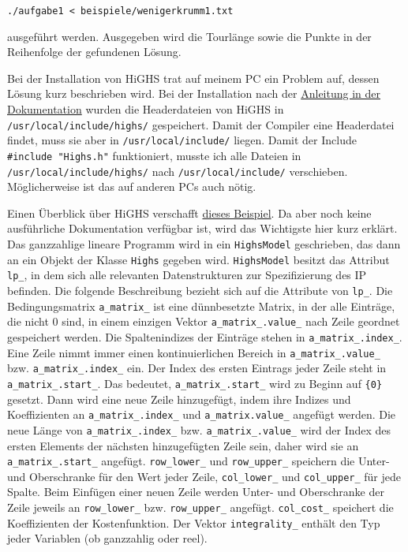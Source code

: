 \documentclass[a4paper, 10pt, ngerman]{article}
\begin{document}
\medskip
\verb|./aufgabe1 < beispiele/wenigerkrumm1.txt|
\medskip

\noindent ausgeführt werden. Ausgegeben wird die Tourlänge sowie die Punkte in der Reihenfolge der gefundenen Lösung.

Bei der Installation von HiGHS trat auf meinem PC ein Problem auf, dessen Lösung kurz beschrieben wird. Bei der Installation nach der \href{https://ergo-code.github.io/HiGHS/dev/cpp/get-started/}{Anleitung in der Dokumentation} wurden die Headerdateien von HiGHS in \verb|/usr/local/include/highs/| gespeichert. Damit der Compiler eine Headerdatei findet, muss sie aber in \verb|/usr/local/include/| liegen. Damit der Include \verb|#include "Highs.h"| funktioniert, musste ich alle Dateien in \verb|/usr/local/include/highs/| nach \verb|/usr/local/include/| verschieben. Möglicherweise ist das auf anderen PCs auch nötig.

Einen Überblick über HiGHS verschafft \href{https://ergo-code.github.io/HiGHS/dev/cpp/library/}{dieses Beispiel}. Da aber noch keine ausführliche Dokumentation verfügbar ist, wird das Wichtigste hier kurz erklärt. Das ganzzahlige lineare Programm wird in ein \verb|HighsModel| geschrieben, das dann an ein Objekt der Klasse \verb|Highs| gegeben wird. \verb|HighsModel| besitzt das Attribut \verb|lp_|, in dem sich alle relevanten Datenstrukturen zur Spezifizierung des IP befinden. Die folgende Beschreibung bezieht sich auf die Attribute von \verb|lp_|. Die Bedingungsmatrix \verb|a_matrix_| ist eine dünnbesetzte Matrix, in der alle Einträge, die nicht 0 sind, in einem einzigen Vektor \verb|a_matrix_.value_| nach Zeile geordnet gespeichert werden. Die Spaltenindizes der Einträge stehen in \verb|a_matrix_.index_|. Eine Zeile nimmt immer einen kontinuierlichen Bereich in \verb|a_matrix_.value_| bzw. \verb|a_matrix_.index_| ein. Der Index des ersten Eintrags jeder Zeile steht in \verb|a_matrix_.start_|. Das bedeutet, \verb|a_matrix_.start_| wird zu Beginn auf \verb|{0}| gesetzt. Dann wird eine neue Zeile hinzugefügt, indem ihre Indizes und Koeffizienten an \verb|a_matrix_.index_| und \verb|a_matrix.value_| angefügt werden. Die neue Länge von \verb|a_matrix_.index_| bzw. \verb|a_matrix_.value_| wird der Index des ersten Elements der nächsten hinzugefügten Zeile sein, daher wird sie an \verb|a_matrix_.start_| angefügt. \verb|row_lower_| und \verb|row_upper_| speichern die Unter- und Oberschranke für den Wert jeder Zeile, \verb|col_lower_| und \verb|col_upper_| für jede Spalte. Beim Einfügen einer neuen Zeile werden Unter- und Oberschranke der Zeile jeweils an \verb|row_lower_| bzw. \verb|row_upper_| angefügt. \verb|col_cost_| speichert die Koeffizienten der Kostenfunktion. Der Vektor \verb|integrality_| enthält den Typ jeder Variablen (ob ganzzahlig oder reel).
\end{document}

